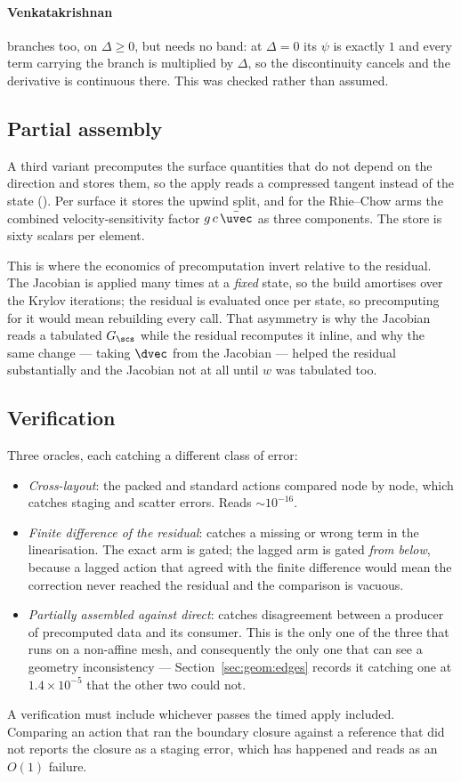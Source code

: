 \paragraph{Venkatakrishnan} branches too, on $\Delta \ge 0$, but needs no band: at $\Delta = 0$ its
$\psi$ is exactly $1$ and every term carrying the branch is multiplied by $\Delta$, so the
discontinuity cancels and the derivative is continuous there. This was checked rather than assumed.

\subsection{Partial assembly}

A third variant precomputes the surface quantities that do not depend on the direction and stores
them, so the apply reads a compressed tangent instead of the state
(). Per surface it stores the upwind split, and for the
Rhie--Chow arms the combined velocity-sensitivity factor $g\,c\,\bar{\uvec}$ as three components.
The store is sixty scalars per element.

This is where the economics of precomputation invert relative to the residual. The Jacobian is
applied many times at a \emph{fixed} state, so the build amortises over the Krylov iterations; the
residual is evaluated once per state, so precomputing for it would mean rebuilding every call.
That asymmetry is why the Jacobian reads a tabulated $G_\scs$ while the residual recomputes it
inline, and why the same change --- taking $\dvec$ from the Jacobian --- helped the residual
substantially and the Jacobian not at all until $w$ was tabulated too.

\subsection{Verification}

Three oracles, each catching a different class of error:

\begin{itemize}
\item \emph{Cross-layout}: the packed and standard actions compared node by node, which catches
      staging and scatter errors. Reads $\sim10^{-16}$.
\item \emph{Finite difference of the residual}: catches a missing or wrong term in the
      linearisation. The exact arm is gated; the lagged arm is gated \emph{from below}, because a
      lagged action that agreed with the finite difference would mean the correction never reached
      the residual and the comparison is vacuous.
\item \emph{Partially assembled against direct}: catches disagreement between a producer of
      precomputed data and its consumer. This is the only one of the three that runs on a
      non-affine mesh, and consequently the only one that can see a geometry inconsistency ---
      Section~\ref{sec:geom:edges} records it catching one at $1.4\times10^{-5}$ that the other
      two could not.
\end{itemize}

A verification must include whichever passes the timed apply included. Comparing an action that
ran the boundary closure against a reference that did not reports the closure as a staging error,
which has happened and reads as an $O(1)$ failure.
